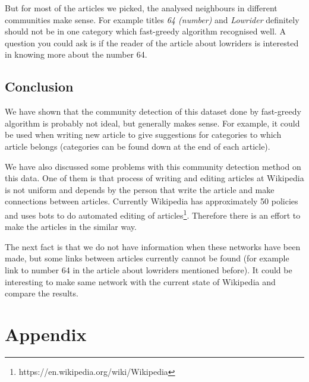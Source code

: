 \documentclass[paper=a4, fontsize=11pt]{scrartcl} %
\begin{document}
But for most of the articles we picked, the analysed neighbours in different communities make sense. For example titles \textit{64 (number)} and \textit{Lowrider} definitely should not be in one category which fast-greedy algorithm recognised well. A question you could ask is if the reader of the article about lowriders is interested in knowing more about the number 64. 

\subsection{Conclusion}
We have shown that the community detection of this dataset done by fast-greedy algorithm is probably not ideal, but generally makes sense. For example, it could be used when writing new article to give suggestions for categories to which article belongs (categories can be found down at the end of each article).

We have also discussed some problems with this community detection method on this data. One of them is that process of writing and editing articles at Wikipedia is not uniform and depends by the person that write the article and make connections between articles. Currently Wikipedia has approximately 50 policies and uses bots to do automated editing of articles\footnote{https://en.wikipedia.org/wiki/Wikipedia}. Therefore there is an effort to make the articles in the similar way.

The next fact is that we do not have information when these networks have been made, but some links between articles currently cannot be found (for example link to number 64 in the article about lowriders mentioned before). It could be interesting to make same network with the current state of Wikipedia and compare the results.

\section{Appendix}
\end{document}
